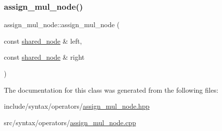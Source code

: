 \subsubsection{\texorpdfstring{assign\+\_\+mul\+\_\+node()}{assign\_mul\_node()}}
{\footnotesize\ttfamily assign\+\_\+mul\+\_\+node\+::assign\+\_\+mul\+\_\+node (\begin{DoxyParamCaption}\item[{const \hyperlink{namespacejawe_a3f307481d921b6cbb50cc8511fc2b544}{shared\+\_\+node} \&}]{left,  }\item[{const \hyperlink{namespacejawe_a3f307481d921b6cbb50cc8511fc2b544}{shared\+\_\+node} \&}]{right }\end{DoxyParamCaption})}



The documentation for this class was generated from the following files\+:\begin{DoxyCompactItemize}
\item 
include/syntax/operators/\hyperlink{assign__mul__node_8hpp}{assign\+\_\+mul\+\_\+node.\+hpp}\item 
src/syntax/operators/\hyperlink{assign__mul__node_8cpp}{assign\+\_\+mul\+\_\+node.\+cpp}\end{DoxyCompactItemize}
